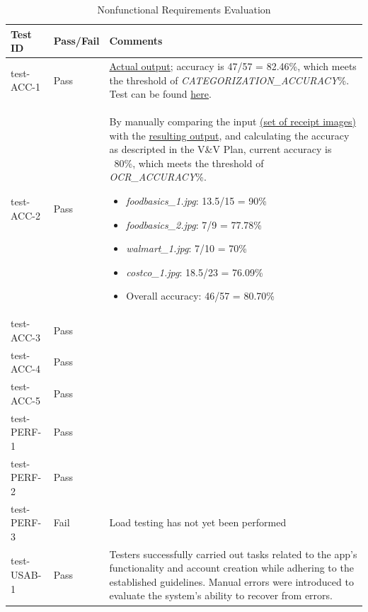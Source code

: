 \documentclass[12pt, titlepage]{article}
\begin{document}
\begin{longtable}{>{\centering\arraybackslash}p{} >{\centering\arraybackslash}p{} >{\centering\arraybackslash}p{}}
  \caption{Nonfunctional Requirements Evaluation}\\
    \toprule
    \textbf{Test ID} & \textbf{Pass/Fail} & \textbf{Comments} \\
    \midrule
    test-ACC-1 & Pass &
    \href{https://github.com/PlutosCapstone/Plutos/tree/main/src/server/tests/imageProcessing/data/categorization/receipt_items_output.csv}{Actual
    output}; accuracy is 47/57 = 82.46\%, which meets the threshold of
    \textit{CATEGORIZATION\_ACCURACY}\%. Test can be found
    \href{https://github.com/PlutosCapstone/Plutos/blob/main/src/server/tests/imageProcessing/test_categorization.py}{here}.
    \\
    test-ACC-2 & Pass & By manually comparing the input
    \href{https://github.com/PlutosCapstone/Plutos/tree/main/src/server/tests/imageProcessing/data/parsing/input}{
    (set of receipt images)} with the
    \href{https://github.com/PlutosCapstone/Plutos/tree/main/src/server/tests/imageProcessing/data/parsing/input}{resulting
    output}, and calculating the accuracy as descripted in the V\&V Plan,
    current accuracy is ~80\%, which meets the threshold of \textit{OCR\_ACCURACY}\%.
    \begin{itemize}
      \item \textit{foodbasics\_1.jpg}: 13.5/15 = 90\%
      \item \textit{foodbasics\_2.jpg}: 7/9 = 77.78\%
      \item \textit{walmart\_1.jpg}: 7/10 = 70\%
      \item \textit{costco\_1.jpg}: 18.5/23 = 76.09\%
      \item Overall accuracy: 46/57 = 80.70\%
    \end{itemize}\\
    test-ACC-3 & Pass &  \\
    test-ACC-4 & Pass &  \\
    test-ACC-5 & Pass &  \\
    \midrule
    test-PERF-1 & Pass &  \\
    test-PERF-2 & Pass &  \\
    test-PERF-3 & Fail & Load testing has not yet been performed \\
    \midrule
    test-USAB-1 & Pass & Testers successfully carried out tasks related to the app's functionality and account creation while adhering to the established guidelines. Manual errors were introduced to evaluate the system's ability to recover from errors. \\

\end{longtable}
\end{document}
